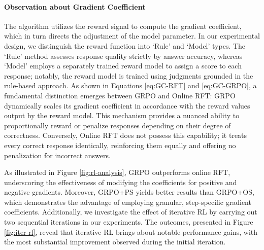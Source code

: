 \begin{itemize}[topsep=0pt]
\begin{itemize}[topsep=0pt]
\paragraph{Observation about Gradient Coefficient} The algorithm utilizes the reward signal to compute the gradient coefficient, which in turn directs the adjustment of the model parameter. In our experimental design, we distinguish the reward function into `Rule' and `Model' types. The `Rule' method assesses response quality strictly by answer accuracy, whereas `Model' employs a separately trained reward model to assign a score to each response; notably, the reward model is trained using judgments grounded in the rule-based approach. As shown in Equations \ref{eq:GC-RFT} and \ref{eq:GC-GRPO}, a fundamental distinction emerges between GRPO and Online RFT: GRPO dynamically scales its gradient coefficient in accordance with the reward values output by the reward model. This mechanism provides a nuanced ability to proportionally reward or penalize responses depending on their degree of correctness. Conversely, Online RFT does not possess this capability; it treats every correct response identically, reinforcing them equally and offering no penalization for incorrect answers.

As illustrated in Figure \ref{fig:rl-analysis}, GRPO outperforms online RFT, underscoring the effectiveness of modifying the coefficients for positive and negative gradients. Moreover, GRPO+PS yields better results than GRPO+OS, which demonstrates the advantage of employing granular, step-specific gradient coefficients. Additionally, we investigate the effect of iterative RL by carrying out two sequential iterations in our experiments. The outcomes, presented in Figure \ref{fig:iter-rl}, reveal that iterative RL brings about notable performance gains, with the most substantial improvement observed during the initial iteration.


\end{itemize}
\end{itemize}

